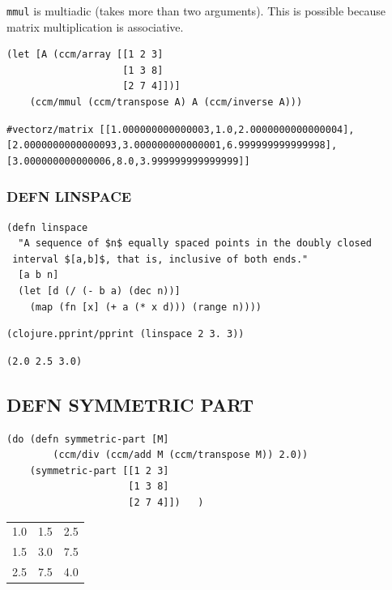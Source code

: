 \documentclass[10pt,oneside,x11names]{article}
\begin{document}
\texttt{mmul} is multiadic (takes more than two arguments). This is possible
because matrix multiplication is associative.

\begin{verbatim}
(let [A (ccm/array [[1 2 3]
                    [1 3 8]
                    [2 7 4]])]
    (ccm/mmul (ccm/transpose A) A (ccm/inverse A)))
\end{verbatim}

\begin{verbatim}
#vectorz/matrix [[1.000000000000003,1.0,2.0000000000000004],
[2.0000000000000093,3.000000000000001,6.999999999999998],
[3.000000000000006,8.0,3.999999999999999]]
\end{verbatim}

\subsubsection{DEFN LINSPACE}
\label{linspace}
\begin{verbatim}
(defn linspace
  "A sequence of $n$ equally spaced points in the doubly closed
 interval $[a,b]$, that is, inclusive of both ends."
  [a b n]
  (let [d (/ (- b a) (dec n))]
    (map (fn [x] (+ a (* x d))) (range n))))
\end{verbatim}

\begin{verbatim}
(clojure.pprint/pprint (linspace 2 3. 3))
\end{verbatim}

\begin{verbatim}
(2.0 2.5 3.0)
\end{verbatim}

\subsection{DEFN SYMMETRIC PART}
\label{sec:org1b5d7f6}

\begin{verbatim}
(do (defn symmetric-part [M]
        (ccm/div (ccm/add M (ccm/transpose M)) 2.0))
    (symmetric-part [[1 2 3]
                     [1 3 8]
                     [2 7 4]])   )
\end{verbatim}

\begin{center}
\begin{tabular}{rrr}
1.0 & 1.5 & 2.5\\
1.5 & 3.0 & 7.5\\
2.5 & 7.5 & 4.0\\
\end{tabular}
\end{center}
\end{document}
